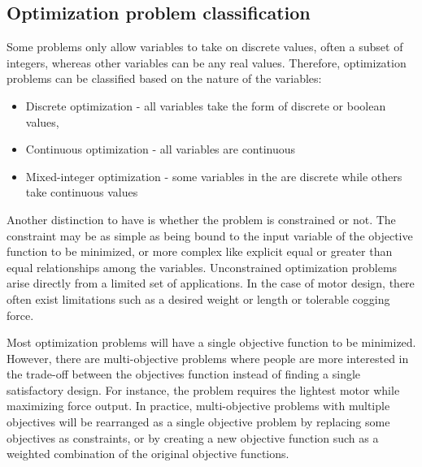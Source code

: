     
    \subsection{Optimization problem classification}    \label{Chapter:background/optimization methods/optimization prob classification}

        
        Some problems only allow variables to take on discrete values, often a subset of integers, whereas other variables can be any real values. Therefore, optimization problems can be classified based on the nature of the variables:

        \begin{itemize}
            \item Discrete optimization - all variables take the form of discrete or boolean values,
            \item Continuous optimization - all variables are continuous
            \item Mixed-integer optimization - some variables in the are discrete while others take continuous values
        \end{itemize}
   
        Another distinction to have is whether the problem is constrained or not. The constraint may be as simple as being bound to the input variable of the objective function to be minimized, or more complex like explicit equal or greater than equal relationships among the variables. Unconstrained optimization problems arise directly from a limited set of applications. In the case of motor design, there often exist limitations such as a desired weight or length or tolerable cogging force.
        
        
        Most optimization problems will have a single objective function to be minimized. However, there are multi-objective problems where people are more interested in the trade-off between the objectives function instead of finding a single satisfactory design. For instance, the problem requires the lightest motor while maximizing force output. In practice, multi-objective problems with multiple objectives will be rearranged as a single objective problem by replacing some objectives as constraints, or by creating a new objective function such as a weighted combination of the original objective functions.
        

